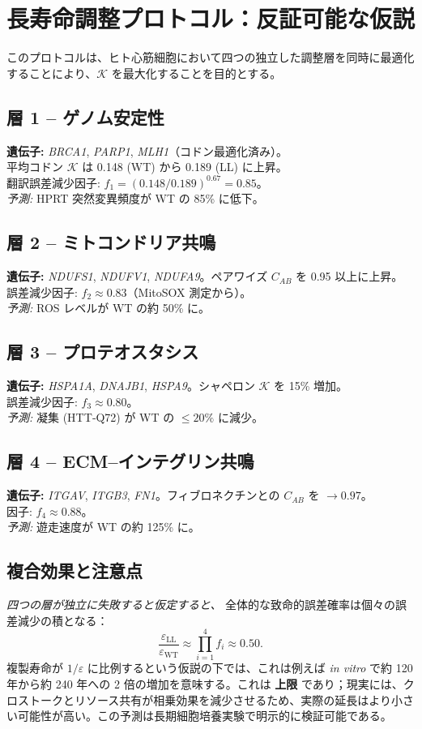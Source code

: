 \documentclass[12pt,a4paper]{ltjsarticle}
\newcommand{\REL}{\mathcal{K}}          %
\begin{document}
	\section{長寿命調整プロトコル：反証可能な仮説}
	\label{sec:LL}
	このプロトコルは、ヒト心筋細胞において四つの独立した調整層を同時に最適化することにより、\(\REL\) を最大化することを目的とする。
	
	\subsection{層 1 – ゲノム安定性}
	\textbf{遺伝子:} \emph{BRCA1}, \emph{PARP1}, \emph{MLH1}（コドン最適化済み）。\\
	平均コドン \(\REL\) は 0.148 (WT) から 0.189 (LL) に上昇。\\
	翻訳誤差減少因子: \(f_1 = (0.148/0.189)^{0.67} = 0.85\)。\\
	\textit{予測:} HPRT 突然変異頻度が WT の 85\% に低下。
	
	\subsection{層 2 – ミトコンドリア共鳴}
	\textbf{遺伝子:} \emph{NDUFS1}, \emph{NDUFV1}, \emph{NDUFA9}。ペアワイズ \(C_{AB}\) を 0.95 以上に上昇。\\
	誤差減少因子: \(f_2 \approx 0.83\)（MitoSOX 測定から）。\\
	\textit{予測:} ROS レベルが WT の約 50\% に。
	
	\subsection{層 3 – プロテオスタシス}
	\textbf{遺伝子:} \emph{HSPA1A}, \emph{DNAJB1}, \emph{HSPA9}。シャペロン \(\REL\) を 15\% 増加。\\
	誤差減少因子: \(f_3 \approx 0.80\)。\\
	\textit{予測:} 凝集 (HTT‑Q72) が WT の \(\le 20\%\) に減少。
	
	\subsection{層 4 – ECM–インテグリン共鳴}
	\textbf{遺伝子:} \emph{ITGAV}, \emph{ITGB3}, \emph{FN1}。フィブロネクチンとの \(C_{AB}\) を \(\to 0.97\)。\\
	因子: \(f_4 \approx 0.88\)。\\
	\textit{予測:} 遊走速度が WT の約 125\% に。
	
	\subsection{複合効果と注意点}
	\textit{四つの層が独立に失敗すると仮定すると、} 全体的な致命的誤差確率は個々の誤差減少の積となる：
	\[
	\frac{\varepsilon_{\mathrm{LL}}}{\varepsilon_{\mathrm{WT}}} \approx \prod_{i=1}^{4} f_i \approx 0.50.
	\]
	複製寿命が \(1/\varepsilon\) に比例するという仮説の下では、これは例えば \textit{in vitro} で約 120 年から約 240 年への 2 倍の増加を意味する。これは \textbf{上限} であり；現実には、クロストークとリソース共有が相乗効果を減少させるため、実際の延長はより小さい可能性が高い。この予測は長期細胞培養実験で明示的に検証可能である。
	
\end{document}
